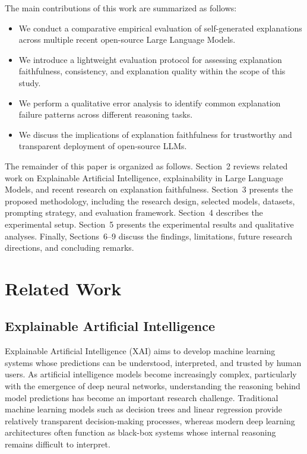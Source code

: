 \documentclass{article}
\begin{document}
The main contributions of this work are summarized as follows:

\begin{itemize}
    \item We conduct a comparative empirical evaluation of self-generated explanations across multiple recent open-source Large Language Models.
    
    \item We introduce a lightweight evaluation protocol for assessing explanation faithfulness, consistency, and explanation quality within the scope of this study.
    
    \item We perform a qualitative error analysis to identify common explanation failure patterns across different reasoning tasks.
    
    \item We discuss the implications of explanation faithfulness for trustworthy and transparent deployment of open-source LLMs.
\end{itemize}

The remainder of this paper is organized as follows. Section~2 reviews related work on Explainable Artificial Intelligence, explainability in Large Language Models, and recent research on explanation faithfulness. Section~3 presents the proposed methodology, including the research design, selected models, datasets, prompting strategy, and evaluation framework. Section~4 describes the experimental setup. Section~5 presents the experimental results and qualitative analyses. Finally, Sections~6--9 discuss the findings, limitations, future research directions, and concluding remarks.




\section{Related Work}

\subsection{Explainable Artificial Intelligence}

Explainable Artificial Intelligence (XAI) aims to develop machine learning systems whose predictions can be understood, interpreted, and trusted by human users. As artificial intelligence models become increasingly complex, particularly with the emergence of deep neural networks, understanding the reasoning behind model predictions has become an important research challenge. Traditional machine learning models such as decision trees and linear regression provide relatively transparent decision-making processes, whereas modern deep learning architectures often function as black-box systems whose internal reasoning remains difficult to interpret.
\end{document}

